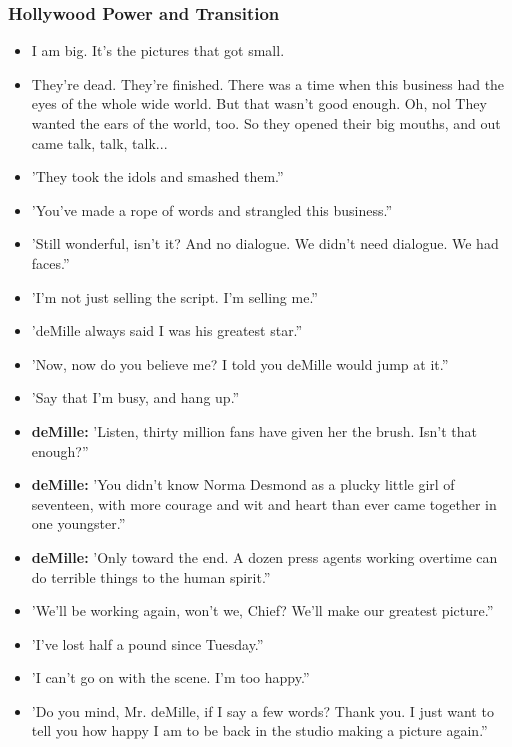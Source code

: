 \documentclass[a4paper]{article}
\begin{document}
\subsubsection{Hollywood Power and Transition}
\begin{itemize}
\item I am big. It's the pictures that got small.
\item They're dead. They're finished. There was a time when this business had the eyes of the whole wide world. But that wasn't good enough. Oh, nol They wanted the ears of the world, too. So they opened their big mouths, and out came talk, talk, talk...
\item 'They took the idols and smashed them.”
\item 'You've made a rope of words and strangled this business.”
\item 'Still wonderful, isn't it? And no dialogue. We didn't need dialogue. We had faces.”
\item 'I'm not just selling the script. I'm selling me.”
\item 'deMille always said I was his greatest star.”
\item 'Now, now do you believe me? I told you deMille would jump at it.”
\item 'Say that I'm busy, and hang up.”
\item \textbf{deMille:} 'Listen, thirty million fans have given her the brush. Isn't that enough?”
\item \textbf{deMille:} 'You didn't know Norma Desmond as a plucky little girl of seventeen, with more courage and wit and heart than ever came together in one youngster.”
\item \textbf{deMille:} 'Only toward the end. A dozen press agents working overtime can do terrible things to the human spirit.”
\item 'We'll be working again, won't we, Chief? We'll make our greatest picture.”
\item 'I've lost half a pound since Tuesday.”
\item 'I can't go on with the scene. I'm too happy.”
\item 'Do you mind, Mr. deMille, if I say a few words? Thank you. I just want to tell you how happy I am to be back in the studio making a picture again.”
\end{itemize}
\end{document}
